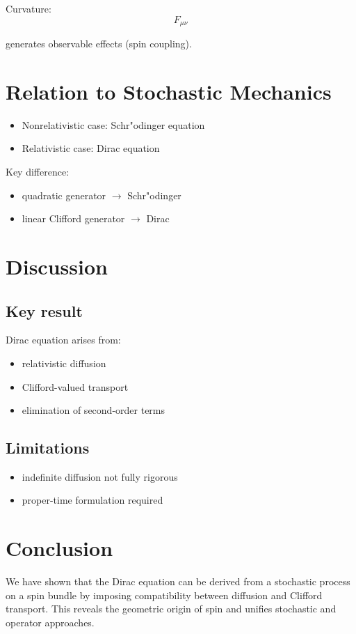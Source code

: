 \documentclass[11pt]{article}
\begin{document}
Curvature:
\[
F_{\mu\nu}
\]

generates observable effects (spin coupling).

\section{Relation to Stochastic Mechanics}

\begin{itemize}
\item Nonrelativistic case: Schr"odinger equation
\item Relativistic case: Dirac equation
\end{itemize}

Key difference:
\begin{itemize}
\item quadratic generator $\rightarrow$ Schr"odinger
\item linear Clifford generator $\rightarrow$ Dirac
\end{itemize}

\section{Discussion}

\subsection{Key result}

Dirac equation arises from:
\begin{itemize}
\item relativistic diffusion
\item Clifford-valued transport
\item elimination of second-order terms
\end{itemize}

\subsection{Limitations}

\begin{itemize}
\item indefinite diffusion not fully rigorous
\item proper-time formulation required
\end{itemize}

\section{Conclusion}

We have shown that the Dirac equation can be derived from a 
stochastic process on a spin bundle by imposing compatibility 
between diffusion and Clifford transport. This reveals the geometric 
origin of spin and unifies stochastic and operator approaches.
\end{document}
